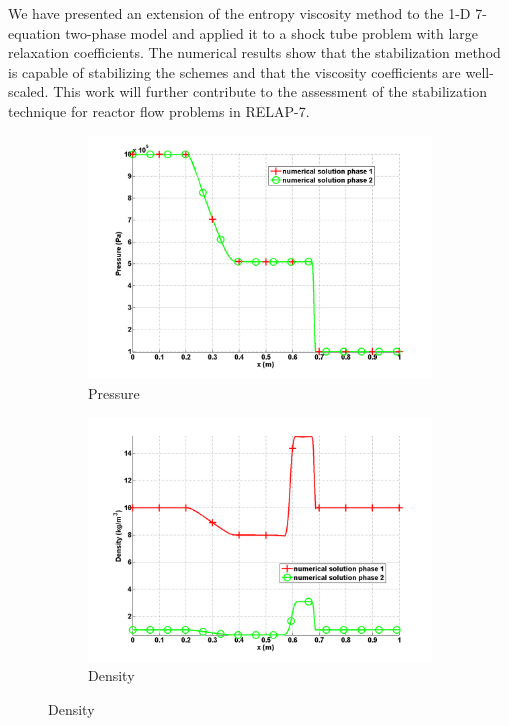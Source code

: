 \documentclass{anstrans}
\begin{document}
We have presented an extension of the entropy viscosity method to the 1-D 7-equation two-phase model and applied it to a shock tube problem with large relaxation coefficients. The numerical results show that the stabilization method is capable of stabilizing the schemes and that the viscosity coefficients are well-scaled. This work will further contribute to the assessment of the stabilization technique for reactor flow problems in RELAP-7.


\begin{figure}[H]
        \centering
        \begin{subfigure}[b]{0.5\textwidth}
                \centering
                \includegraphics[width=\textwidth]{plots/relaxation_two_phases_pressure.png}
                \caption{Pressure}
                \label{fig:pressure}
        \end{subfigure}%

        \begin{subfigure}[b]{0.5\textwidth}
                \centering
                \includegraphics[width=\textwidth]{plots/relaxation_two_phases_density.png}
                \caption{Density}
                \label{fig:density}
        \end{subfigure}%


\end{figure}
\end{document}
